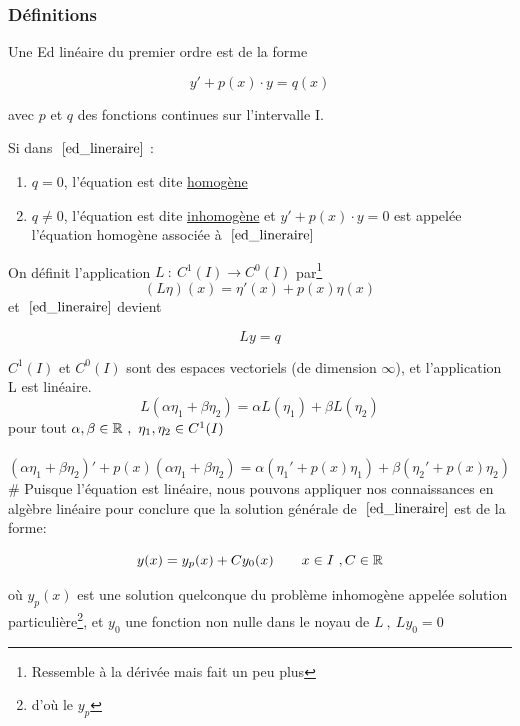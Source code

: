 \documentclass[12pt,a4paper]{article}
\begin{document}
\subsubsection{Définitions}
Une Ed linéaire du premier ordre est de la forme 
\begin{boite}[0.5]
	\begin{equation}
		y' + p(x)\cdot y = q(x)
		\label{ed_lineraire}
		\end{equation}
\end{boite}
avec $p$ et $q$ des fonctions continues sur l'intervalle I.
\begin{boite}
	 Si dans $~\eqref{ed_lineraire}$ :
	\begin{enumerate}
		\item $q = 0$, l'équation est dite \underline{homogène}
		\item $q \neq 0$, l'équation est dite \underline{inhomogène} et $y' + p(x)\cdot y = 0$ est appelée l'équation homogène associée à $~\eqref{ed_lineraire}$
	\end{enumerate}
\end{boite}
On définit l'application $L\ :\ C^1(I) \to C^0(I)$ par\footnote{Ressemble à la dérivée mais fait un peu plus}
\begin{equation*}
	(L\eta)(x) = \eta'(x) + p(x)\eta(x)
\end{equation*}
et $~\eqref{ed_lineraire}$ devient 
\begin{boite}[0.25]
	\begin{equation*}
		Ly = q
	\end{equation*}
\end{boite}
$C^1(I)$ et $C^0(I)$ sont des espaces vectoriels (de dimension $\infty$), et l'application L est linéaire.
\begin{equation*}
	L(\alpha\eta_1 + \beta\eta_2) = \alpha L(\eta_1) + \beta L(\eta_2)
\end{equation*}
pour tout $\alpha,\beta \in \R \ , \ \eta_1,\eta_2 \in C^1(I)$\\
\\
$(\alpha\eta_1 + \beta\eta_2)' + p(x)(\alpha\eta_1 + \beta\eta_2) = \alpha(\eta_1' + p(x)\eta_1) + \beta(\eta_2' + p(x)\eta_2)\qquad$ \#
Puisque l'équation est linéaire, nous pouvons appliquer nos connaissances en algèbre linéaire pour conclure que la solution générale de $~\eqref{ed_lineraire}$  est de la forme:
\begin{boite}[0.67]
	\begin{equation*}
		y(x) = y_p(x) + Cy_0(x) \qquad x\in I \ ,C\in\R
	\end{equation*}
\end{boite}
où $y_p(x)$ est une solution quelconque du problème inhomogène appelée solution particulière\footnote{d'où le $y_p$}, et $y_0$ une fonction non nulle dans le noyau  de $L \ , \ Ly_0 = 0$
\end{document}
